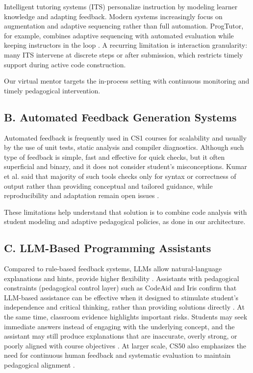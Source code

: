 \documentclass[conference]{IEEEtran}
\begin{document}
Intelligent tutoring systems (ITS) personalize instruction by modeling learner knowledge and adapting feedback. Modern systems increasingly focus on augmentation and adaptive sequencing rather than full automation. ProgTutor, for example, combines adaptive sequencing with automated evaluation while keeping instructors in the loop \cite{ProgTutor}. A recurring limitation is interaction granularity: many ITS intervene at discrete steps or after submission, which restricts timely support during active code construction.

Our virtual mentor targets the in-process setting with continuous monitoring and timely pedagogical intervention.

\subsection*{B. Automated Feedback Generation Systems}

Automated feedback is frequently used in CS1 courses for scalability and usually by the use of unit tests, static analysis and compiler diagnostics. Although such type of feedback is simple, fast and effective for quick checks, but it often superficial and binary, and it does not consider student’s misconceptions. Kumar et al. said that majority of such tools checks only for syntax or correctness of output rather than providing conceptual and tailored guidance, while reproducibility and adaptation remain open issues \cite{NavigatingAutomatedFeedback}.

These limitations help understand that solution is to combine
code analysis with student modeling and adaptive pedagogical
policies, as done in our architecture.

\subsection*{C. LLM-Based Programming Assistants}

Compared to rule-based feedback systems, LLMs allow
natural-language explanations and hints, provide higher flexibility \cite{SystematicLiteratureReviewonLLM}. Assistants with pedagogical constraints (pedagogical control layer) such as CodeAid and Iris confirm that LLM-based assistance can be effective when it designed to stimulate student’s independence and critical thinking, rather than providing solutions directly \cite{CodeAid,IRIS}. At the same time, classroom evidence highlights important risks. Students may seek immediate answers instead of engaging with the underlying concept, and the assistant may still produce explanations that are inaccurate, overly strong, or poorly aligned with course objectives \cite{PatternsofLLMPoweredProgrammingAssistant,FeasibilityStudyofAugmentingTeachingAssistantswithAI}. At larger scale, CS50 also emphasizes the need for continuous human feedback and systematic evaluation to
maintain pedagogical alignment \cite{ImprovingAIinCS50}.
\end{document}
